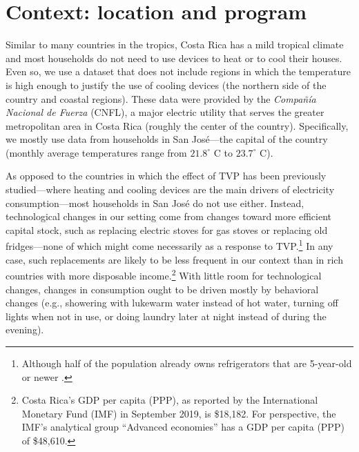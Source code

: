 \documentclass[12pt]{article}
\begin{document}
\section{Context: location and program}

Similar to many countries in the tropics, Costa Rica has a mild tropical climate and most households do not need to use devices to heat or to cool their houses. Even so, we use a dataset that does not include regions in which the temperature is high enough to justify the use of cooling devices (the northern side of the country and coastal regions). These data were provided by the \emph{Compañía Nacional de Fuerza} (CNFL), a major electric utility that serves the greater metropolitan area in Costa Rica (roughly the center of the country). Specifically, we mostly use data from households in San José---the capital of the country (monthly average temperatures range from $21.8 ^{\circ}$  C to $23.7^{\circ}$ C).

As opposed to the countries in which the effect of TVP has been previously studied---where heating and cooling devices are the main drivers of electricity consumption---most households in San José do not use either. Instead, technological changes in our setting come from changes toward more efficient capital stock, such as replacing electric stoves for gas stoves or replacing old fridges---none of which might come necessarily as a response to TVP.\footnote{ Although half of the population already owns refrigerators that are 5-year-old or newer \citep{ministeriodeambienteyenergiaEstudioParaCaracterizacion2019}.} In any case, such replacements are likely to be less frequent in our context than in rich countries with more disposable income.\footnote{Costa Rica’s GDP per capita (PPP), as reported by the International Monetary Fund (IMF) in September 2019, is \$18,182. For perspective, the IMF’s analytical group \enquote{Advanced economies} has a GDP per capita (PPP) of \$48,610.} With little room for technological changes, changes in consumption ought to be driven mostly by behavioral changes (e.g., showering with lukewarm water instead of hot water, turning off lights when not in use, or doing laundry later at night instead of during the evening).
\end{document}
